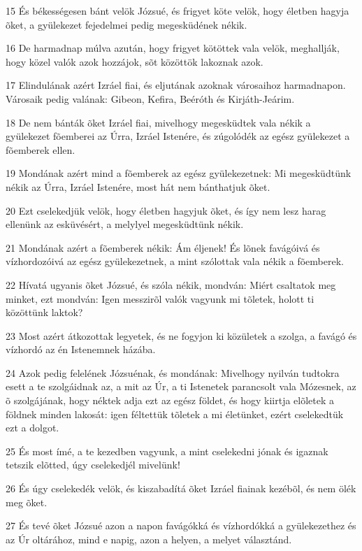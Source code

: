 \par 15 És békességesen bánt velök Józsué, és frigyet köte velök, hogy életben hagyja õket, a gyülekezet fejedelmei pedig megesküdének nékik.
\par 16 De harmadnap múlva azután, hogy frigyet kötöttek vala velök, meghallják, hogy közel valók azok hozzájok, sõt közöttök lakoznak azok.
\par 17 Elindulának azért Izráel fiai, és eljutának azoknak városaihoz harmadnapon. Városaik pedig valának: Gibeon, Kefira, Beéróth és Kirjáth-Jeárim.
\par 18 De nem bánták õket Izráel fiai, mivelhogy megesküdtek vala nékik a gyülekezet fõemberei az Úrra, Izráel Istenére, és zúgolódék az egész gyülekezet a fõemberek ellen.
\par 19 Mondának azért mind a fõemberek az egész gyülekezetnek: Mi megesküdtünk nékik az Úrra, Izráel Istenére, most hát nem bánthatjuk õket.
\par 20 Ezt cselekedjük velök, hogy életben hagyjuk õket, és így nem lesz harag ellenünk az esküvésért, a melylyel megesküdtünk nékik.
\par 21 Mondának azért a fõemberek nékik: Ám éljenek! És lõnek favágóivá és vízhordozóivá az egész gyülekezetnek, a mint szólottak vala nékik a fõemberek.
\par 22 Hívatá ugyanis õket Józsué, és szóla nékik, mondván: Miért csaltatok meg minket, ezt mondván: Igen messzirõl valók vagyunk mi tõletek, holott ti közöttünk laktok?
\par 23 Most azért átkozottak legyetek, és ne fogyjon ki közületek a szolga, a favágó és vízhordó az én Istenemnek házába.
\par 24 Azok pedig felelének Józsuénak, és mondának: Mivelhogy nyilván tudtokra esett a te szolgáidnak az, a mit az Úr, a ti Istenetek parancsolt vala Mózesnek, az õ szolgájának, hogy néktek adja ezt az egész földet, és hogy kiirtja elõletek a földnek minden lakosát: igen féltettük  tõletek a mi életünket, ezért cselekedtük ezt a dolgot.
\par 25 És most ímé, a te kezedben vagyunk, a mint cselekedni jónak és igaznak tetszik elõtted, úgy cselekedjél mivelünk!
\par 26 És úgy cselekedék velök, és kiszabadítá õket Izráel fiainak kezébõl, és nem ölék meg õket.
\par 27 És tevé õket Józsué azon a napon favágókká és vízhordókká a gyülekezethez és az Úr oltárához, mind e napig, azon a helyen, a melyet választánd.

